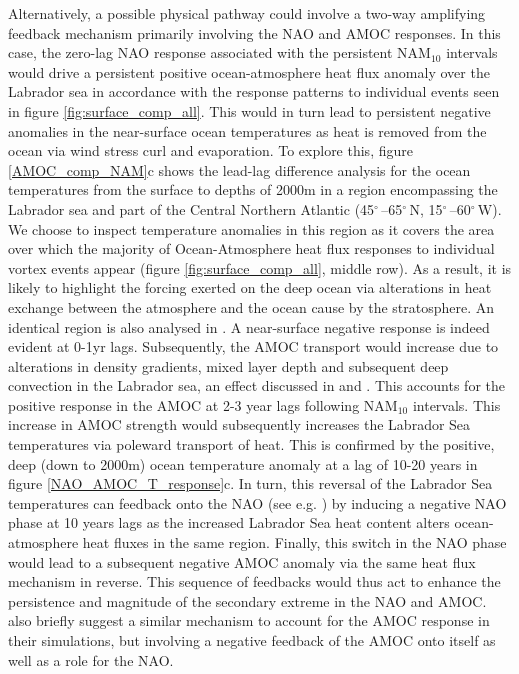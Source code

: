 Alternatively, a possible physical pathway could involve a two-way amplifying feedback mechanism primarily involving  the NAO and AMOC responses. In this case, the zero-lag NAO response associated with the persistent NAM$_{10}$ intervals would drive a persistent positive ocean-atmosphere heat flux anomaly over the Labrador sea in accordance with the response patterns to individual events seen in figure \ref{fig:surface_comp_all}. This would in turn lead to persistent negative anomalies in the near-surface ocean temperatures as heat is  removed from the ocean via wind stress curl and evaporation. To explore this, figure \ref{AMOC_comp_NAM}c shows the lead-lag difference analysis for the ocean temperatures from the surface to depths of 2000m in a region encompassing the Labrador sea and part of the Central Northern Atlantic (45$^{\circ}$\,–65$^{\circ}$\,N, 15$^{\circ}$\,–60$^{\circ}$\,W). We choose to inspect temperature anomalies in this region as it covers the area over which the majority of Ocean-Atmosphere heat flux responses to individual vortex events appear (figure \ref{fig:surface_comp_all}, middle row). As a result, it is likely to highlight the forcing exerted on the deep ocean via alterations in heat exchange between the atmosphere and the ocean cause by the stratosphere. An identical region is also analysed in \cite{reichlerStratospheric2012}. A near-surface negative response is indeed evident at 0-1yr lags. Subsequently, the AMOC transport would increase due to alterations in density gradients, mixed layer depth and subsequent deep convection in the Labrador sea, an effect discussed in \cite{delworthInterdecadal1993} and \cite{medhaugMechanisms2012}. This accounts for the positive response in the AMOC at 2-3 year lags following NAM$_{10}$ intervals. This increase in AMOC strength would subsequently increases the Labrador Sea temperatures via poleward transport of heat. This is confirmed by the positive, deep (down to 2000m) ocean temperature anomaly at a lag of 10-20 years in figure \ref{NAO_AMOC_T_response}c. In turn, this reversal of the Labrador Sea temperatures can feedback onto the NAO (see e.g. \cite{frankignoulInfluence2013}) by inducing a negative NAO phase at 10 years lags as the increased Labrador Sea heat content alters ocean-atmosphere heat fluxes in the same region.  Finally, this switch in the NAO phase would lead to a subsequent negative AMOC anomaly via the same heat flux mechanism in reverse. This sequence of feedbacks would thus act to enhance the persistence and magnitude of the secondary extreme in the NAO and AMOC. \cite{reichlerStratospheric2012} also briefly suggest a similar mechanism to account for the AMOC response in their simulations, but involving a negative feedback of the AMOC onto itself as well as a role for the NAO. 


